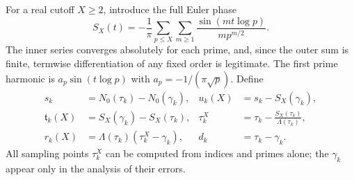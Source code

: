\documentclass[11pt,reqno]{amsart}
\numberwithin{equation}{section}
\newcommand{\lamb}{\Lambda}
\begin{document}
For a real cutoff $X\ge2$, introduce the full Euler phase
\begin{equation}\label{eq:Sx}
S_X(t)=-\frac1\pi\sum_{p\le X}\sum_{m\ge1}
\frac{\sin(mt\log p)}{m p^{m/2}}.
\end{equation}
The inner series converges absolutely for each prime, and, since the outer sum is finite, termwise differentiation of any fixed order is legitimate. The first prime harmonic is $a_p\sin(t\log p)$ with $a_p=-1/(\pi\sqrt p)$. Define
\begin{equation}\label{eq:defs}
\begin{aligned}
s_k&=N_0(\tau_k)-N_0(\gamma_k),
&u_k(X)&=s_k-S_X(\gamma_k),\\
\mathfrak t_k(X)&=S_X(\gamma_k)-S_X(\tau_k),
&\tau_k^X&=\tau_k-\frac{S_X(\tau_k)}{\lamb(\tau_k)},\\
r_k(X)&=\lamb(\tau_k)(\tau_k^X-\gamma_k),
&d_k&=\tau_k-\gamma_k.
\end{aligned}
\end{equation}
All sampling points $\tau_k^X$ can be computed from indices and primes alone; the $\gamma_k$ appear only in the analysis of their errors.
\end{document}

